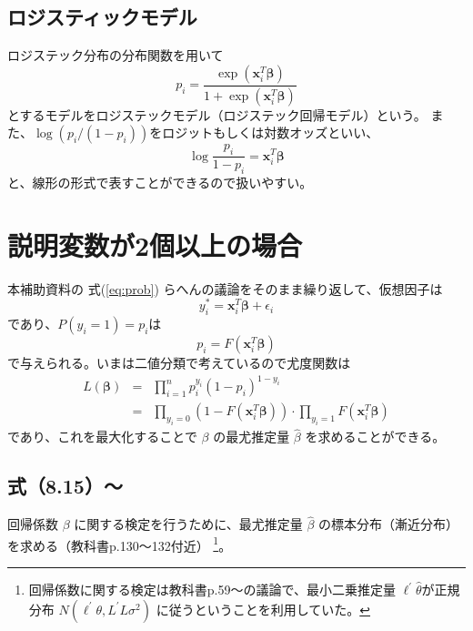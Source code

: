 \documentclass[10pt, a4paper]{ltjsarticle}
\newcommand\refeq[1]{式(\ref{#1})}
\begin{document}
\subsection{ロジスティックモデル}

ロジステック分布の分布関数を用いて
\begin{equation}
  p_i = \frac{\exp(\bm{x}_i^T\bm{\beta})}{1+\exp(\bm{x}_i^T\bm{\beta})}
\end{equation}
とするモデルをロジステックモデル（ロジステック回帰モデル）という。
また、$\log(p_i/(1-p_i))$をロジットもしくは対数オッズといい、
\begin{equation}
  \log\frac{p_i}{1-p_i} = \bm{x}_i^T\bm{\beta}
\end{equation}
と、線形の形式で表すことができるので扱いやすい。



\section{説明変数が2個以上の場合}

本補助資料の \refeq{eq:prob} らへんの議論をそのまま繰り返して、仮想因子は
\begin{equation}
  y_i^\ast = \bm{x}_i^T\bm{\beta} + \epsilon_i
\end{equation}
であり、$P(y_i=1)=p_i$は
\begin{equation}
  p_i = F(\bm{x}_i^T\bm{\beta})
\end{equation}
で与えられる。いまは二値分類で考えているので尤度関数は
\begin{eqnarray}
  L(\bm{\beta}) &=& \prod_{i=1}^n p_{i}^{y_i}(1-p_i)^{1-y_i} \\
&=& \prod_{y_i=0} (1-F(\bm{x}_i^T\bm{\beta})) \cdot \prod_{y_i=1} F(\bm{x}_i^T\bm{\beta})
\end{eqnarray}
であり、これを最大化することで $\beta$ の最尤推定量 $\hat{\beta}$ を求めることができる。



\subsection{式（8.15）〜}
回帰係数 $\beta$ に関する検定を行うために、最尤推定量 $\hat{\beta}$ の標本分布（漸近分布）を求める（教科書p.130〜132付近）
\footnote{回帰係数に関する検定は教科書p.59〜の議論で、最小二乗推定量 $\ell^\prime\hat{\theta}$が正規分布 $N(\ell^\prime\theta, L^\prime L\sigma^2)$ に従うということを利用していた。}。
\end{document}
